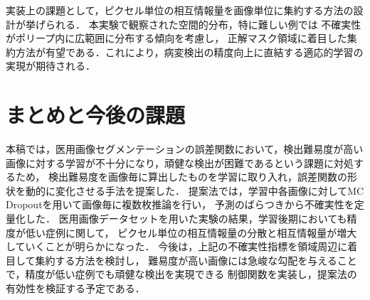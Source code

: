 \documentclass[10pt, a4paper, twocolumn]{jarticle}
\begin{document}
実装上の課題として，ピクセル単位の相互情報量を画像単位に集約する方法の設計が挙げられる．
本実験で観察された空間的分布，特に難しい例では
不確実性がポリープ内に広範囲に分布する傾向を考慮し，
正解マスク領域に着目した集約方法が有望である．これにより，病変検出の精度向上に直結する適応的学習の実現が期待される．

\section{まとめと今後の課題}
本稿では，医用画像セグメンテーションの誤差関数において，検出難易度が高い画像に対する学習が不十分になり，頑健な検出が困難であるという課題に対処するため，
検出難易度を画像毎に算出したものを学習に取り入れ，誤差関数の形状を動的に変化させる手法を提案した．
提案法では，学習中各画像に対してMC Dropoutを用いて画像毎に複数枚推論を行い，
予測のばらつきから不確実性を定量化した．
医用画像データセットを用いた実験の結果，学習後期においても精度が低い症例に関して，
ピクセル単位の相互情報量の分散と相互情報量が増大していくことが明らかになった．
今後は，上記の不確実性指標を領域周辺に着目して集約する方法を検討し，
難易度が高い画像には急峻な勾配を与えることで，精度が低い症例でも頑健な検出を実現できる
制御関数を実装し，提案法の有効性を検証する予定である．


    

\clearpage %
\end{document}
